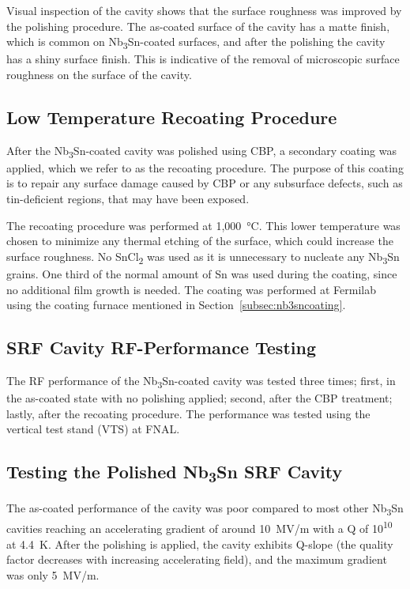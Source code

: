 \documentclass[reprint,amsmath,amssymb,aps]{revtex4-2}%
\begin{document}
Visual inspection of the cavity shows that the surface roughness was improved by the polishing procedure. The as-coated surface of the cavity has a matte finish, which is common on Nb\textsubscript{3}Sn-coated surfaces, and after the polishing the cavity has a shiny surface finish. This is indicative of the removal of microscopic surface roughness on the surface of the cavity.
%
\subsection{Low Temperature Recoating Procedure}%
\label{subsec:recoating}%
After the Nb\textsubscript{3}Sn-coated cavity was polished using CBP, a secondary coating was applied, which we refer to as the recoating procedure. The purpose of this coating is to repair any surface damage caused by CBP or any subsurface defects, such as tin-deficient regions, that may have been exposed.

The recoating procedure was performed at 1,000~°C. This lower temperature was chosen to minimize any thermal etching of the surface, which could increase the surface roughness. No SnCl\textsubscript{2} was used as it is unnecessary to nucleate any Nb\textsubscript{3}Sn grains. One third of the normal amount of Sn was used during the coating, since no additional film growth is needed. The coating was performed at Fermilab using the coating furnace mentioned in Section~\ref{subsec:nb3sncoating}.

%
\subsection{SRF Cavity RF-Performance Testing}%
\label{subsec:vts}%
The RF performance of the Nb\textsubscript{3}Sn-coated cavity was tested three times; first, in the as-coated state with no polishing applied; second, after the CBP treatment; lastly, after the recoating procedure. The performance was tested using the vertical test stand (VTS) at FNAL\cite{pischalnikov2014rf}.

%
\subsection{Testing the Polished Nb\textsubscript{3}Sn SRF Cavity}%
\label{subsec:cavityresults}%
The as-coated performance of the cavity was poor compared to most other Nb\textsubscript{3}Sn cavities reaching an accelerating gradient of around 10~MV/m with a Q of 10\textsuperscript{10} at 4.4~K. After the polishing is applied, the cavity exhibits Q-slope (the quality factor decreases with increasing accelerating field), and the maximum gradient was only 5~MV/m.
\end{document}
